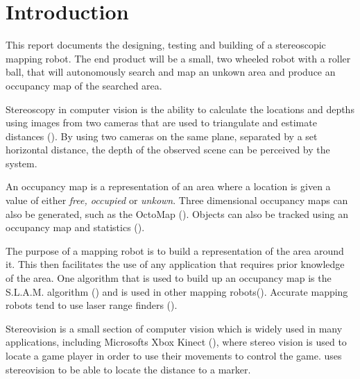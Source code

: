 \chapter{Introduction} \label{Chapter:Introduction}

%
%
%
%


This report documents the designing, testing and building of a stereoscopic mapping robot. The end product will be a small, two wheeled robot with a roller ball, that will autonomously search and map an unkown area and produce an occupancy map of the searched area. 

Stereoscopy in computer vision is the ability to calculate the locations and depths using images from two cameras that are used to triangulate and estimate distances (\cite{Saxena:DepthEstimation}). By using two cameras on the same plane, separated by a set horizontal distance, the depth of the observed scene can be perceived by the system.

An occupancy map is a representation of an area where a location is given a value of either \textit{free, occupied} or \textit{unkown}\cite{thrun2003learning}.  Three dimensional occupancy maps can also be generated, such as the OctoMap (\cite{octomap}). Objects can also be tracked using an occupancy map and statistics (\cite{Fleuret:OccupancyMap}). 

The purpose of a mapping robot is to build a representation of the area around it. This then facilitates the use of any application that requires prior knowledge of the area. One algorithm that is used to build up an occupancy map is the S.L.A.M. algorithm (\cite{Thrun:SLAM}) and is used in other mapping robots(\cite{Se:MappingRobot}). Accurate mapping robots tend to use laser range finders (\cite{Ruhnke:LaserMapping}).

Stereovision is a small section of computer vision which is widely used in many applications, including Microsofts Xbox Kinect (\cite{Microsoft:Kinect}), where stereo vision is used to locate a game player in order to use their movements to control the game. \cite{Mrovlje:Distance_Stereoscopic} uses stereovision to be able to locate the distance to a marker.

